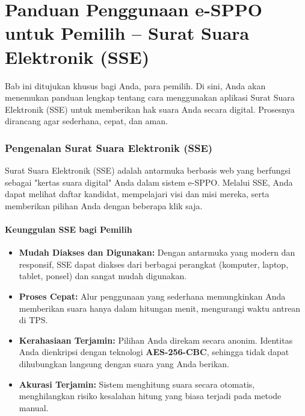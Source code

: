 
\part{Panduan Penggunaan e-SPPO untuk Pemilih -- Surat Suara Elektronik (SSE)}
\label{part:penggunaan_sse}
Bab ini ditujukan khusus bagi Anda, para pemilih. Di sini, Anda akan menemukan panduan lengkap tentang cara menggunakan aplikasi Surat Suara Elektronik (SSE) untuk memberikan hak suara Anda secara digital. Prosesnya dirancang agar sederhana, cepat, dan aman.

\section{Pengenalan Surat Suara Elektronik (SSE)}
\label{sec:pengenalan_sse}
Surat Suara Elektronik (SSE) adalah antarmuka berbasis web yang berfungsi sebagai "kertas suara digital" Anda dalam sistem e-SPPO. Melalui SSE, Anda dapat melihat daftar kandidat, mempelajari visi dan misi mereka, serta memberikan pilihan Anda dengan beberapa klik saja.

\subsection{Keunggulan SSE bagi Pemilih}
\begin{itemize}
	\item \textbf{Mudah Diakses dan Digunakan:} Dengan antarmuka yang modern dan responsif, SSE dapat diakses dari berbagai perangkat (komputer, laptop, tablet, ponsel) dan sangat mudah digunakan.
	\item \textbf{Proses Cepat:} Alur penggunaan yang sederhana memungkinkan Anda memberikan suara hanya dalam hitungan menit, mengurangi waktu antrean di TPS.
	\item \textbf{Kerahasiaan Terjamin:} Pilihan Anda direkam secara anonim. Identitas Anda dienkripsi dengan teknologi \textbf{AES-256-CBC}, sehingga tidak dapat dihubungkan langsung dengan suara yang Anda berikan.
	\item \textbf{Akurasi Terjamin:} Sistem menghitung suara secara otomatis, menghilangkan risiko kesalahan hitung yang biasa terjadi pada metode manual.
\end{itemize}

